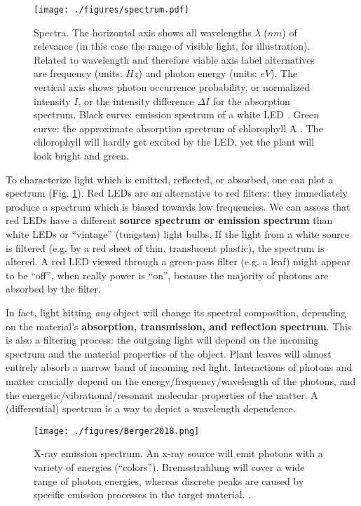 \begin{figure}[p]
\centering
\texttt{[image: ./figures/spectrum.pdf]}
\caption{\label{fig:spectrum}Spectra. The horizontal axis shows all wavelengths \(\lambda\) (\(nm\)) of relevance (in this case the range of visible light, for illustration). Related to wavelength and therefore viable axis label alternatives are frequency (units: \(Hz\)) and photon energy (units: \(eV\)). The vertical axis shows photon occurrence probability, or normalized intensity \(I\), or the intensity difference \(\Delta I\) for the absorption spectrum. Black curve: emission spectrum of a white LED \citep{Tanabe2005}. Green curve: the approximate absorption spectrum of chlorophyll A \citep{Zscheile1934}. The chlorophyll will hardly get excited by the LED, yet the plant will look bright and green.}
\end{figure}


To characterize light which is emitted, reflected, or absorbed, one can plot a spectrum (Fig. \ref{fig:spectrum}).
Red LEDs are an alternative to red filters: they immediately produce a spectrum which is biased towards low frequencies.
We can assess that red LEDs have a different \textbf{source spectrum or emission spectrum} than white LEDs or ``vintage'' (tungsten) light bulbs.
If the light from a white source is filtered (e.g. by a red sheet of thin, translucent plastic), the spectrum is altered.
A red LED viewed through a green-pass filter (e.g. a leaf) might appear to be ``off'', when really power is ``on'', because the majority of photons are absorbed by the filter.

In fact, light hitting \emph{any} object will change its spectral composition, depending on the material's \textbf{absorption, transmission, and reflection spectrum}.
This is also a filtering process: the outgoing light will depend on the incoming spectrum and the material properties of the object.
Plant leaves will almost entirely absorb a narrow band of incoming red light.
Interactions of photons and matter crucially depend on the energy/frequency/wavelength of the photons, and the energetic/vibrational/resonant molecular properties of the matter.
A (differential) spectrum is a way to depict a wavelength dependence.


\begin{figure}[p]
\centering
\texttt{[image: ./figures/Berger2018.png]}
\caption{\label{fig:xray_emission}X-ray emission spectrum. An x-ray source will emit photons with a variety of energies (``colors''). Bremsstrahlung will cover a wide range of photon energies, whereas discrete peaks are caused by specific emission processes in the target material. \citep[taken from ][creative commons license]{Berger2018fig8}.}
\end{figure}

